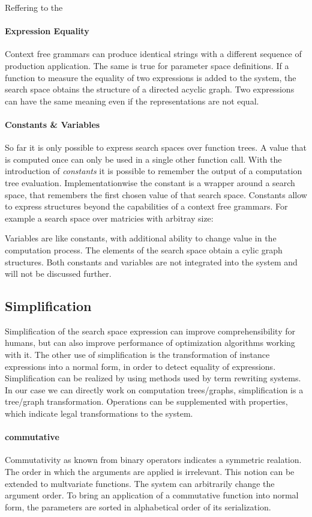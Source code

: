 \documentclass[english]{article}
\begin{document}
Reffering to the

\paragraph{Expression Equality}
Context free grammars can produce identical strings with a different sequence of production application. The same is true for parameter space definitions.
If a function to measure the equality of two expressions is added to the system, the search space obtains the structure of a directed acyclic graph.
Two expressions can have the same meaning even if the representations are not equal.

\paragraph{Constants \& Variables}
So far it is only possible to express search spaces over function trees.
A value that is computed once can only be used in a single other function call. With the introduction of \textit{constants} it is possible to remember the output of a computation tree evaluation. Implementationwise the constant is a wrapper around a search space, that remembers the first chosen value of that search space.
Constants allow to express structures beyond the capabilities of a context free grammars. For example a search space over matricies with arbitray size:

Variables are like constants, with additional ability to change value in the computation process. The elements of the search space obtain a cylic graph structures.
Both constants and variables are not integrated into the system and will not be discussed further.

\subsection{Simplification}
Simplification of the search space expression can improve comprehensibility for humans, but can also improve performance of optimization algorithms working with it. The other use of simplification is the transformation of instance expressions into a normal form, in order to detect equality of expressions.
Simplification can be realized by using methods used by term rewriting systems. In our case we can directly work on computation trees/graphs,  simplification is a tree/graph transformation. Operations can be supplemented with properties, which indicate legal transformations to the system.

\paragraph{commutative} Commutativity as known from binary operators indicates a symmetric realation. The order in which the arguments are applied is irrelevant. This notion can be extended to multvariate functions. The system can arbitrarily change the argument order. To bring an application of a commutative function into normal form, the parameters are sorted in alphabetical order of its serialization.
\end{document}
